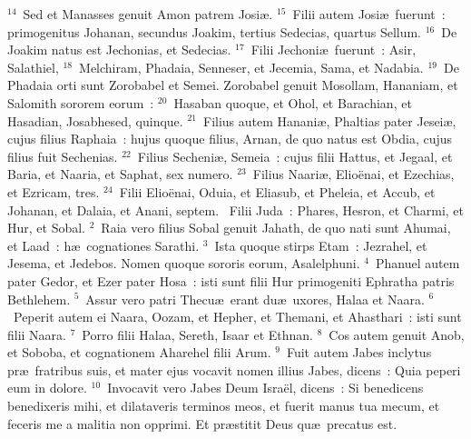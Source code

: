 ${}^{14}$~Sed et Manasses genuit Amon patrem Josi\ae .
${}^{15}$~Filii autem Josi\ae\ fuerunt~: primogenitus Johanan, secundus Joakim, tertius Sedecias, quartus Sellum.
${}^{16}$~De Joakim natus est Jechonias, et Sedecias.
${}^{17}$~Filii Jechoni\ae\ fuerunt~: Asir, Salathiel,
${}^{18}$~Melchiram, Phadaia, Senneser, et Jecemia, Sama, et Nadabia.
${}^{19}$~De Phadaia orti sunt Zorobabel et Semei. Zorobabel genuit Mosollam, Hananiam, et Salomith sororem eorum~:
${}^{20}$~Hasaban quoque, et Ohol, et Barachian, et Hasadian, Josabhesed, quinque.
${}^{21}$~Filius autem Hanani\ae , Phaltias pater Jesei\ae , cujus filius Raphaia~: hujus quoque filius, Arnan, de quo natus est Obdia, cujus filius fuit Sechenias.
${}^{22}$~Filius Secheni\ae , Semeia~: cujus filii Hattus, et Jegaal, et Baria, et Naaria, et Saphat, sex numero.
${}^{23}$~Filius Naari\ae , Elio\"enai, et Ezechias, et Ezricam, tres.
${}^{24}$~Filii Elio\"enai, Oduia, et Eliasub, et Pheleia, et Accub, et Johanan, et Dalaia, et Anani, septem.
~\lettrine[lines=10,image=true,loversize=0.05,lraise=-0.03]{F}{}ilii Juda~: Phares, Hesron, et Charmi, et Hur, et Sobal.
${}^{2}$~Raia vero filius Sobal genuit Jahath, de quo nati sunt Ahumai, et Laad~: h\ae\ cognationes Sarathi.
${}^{3}$~Ista quoque stirps Etam~: Jezrahel, et Jesema, et Jedebos. Nomen quoque sororis eorum, Asalelphuni.
${}^{4}$~Phanuel autem pater Gedor, et Ezer pater Hosa~: isti sunt filii Hur primogeniti Ephratha patris Bethlehem.
${}^{5}$~Assur vero patri Thecu\ae\ erant du\ae\ uxores, Halaa et Naara.
${}^{6}$~Peperit autem ei Naara, Oozam, et Hepher, et Themani, et Ahasthari~: isti sunt filii Naara.
${}^{7}$~Porro filii Halaa, Sereth, Isaar et Ethnan.
${}^{8}$~Cos autem genuit Anob, et Soboba, et cognationem Aharehel filii Arum.
${}^{9}$~Fuit autem Jabes inclytus pr\ae\ fratribus suis, et mater ejus vocavit nomen illius Jabes, dicens~: Quia peperi eum in dolore.
${}^{10}$~Invocavit vero Jabes Deum Isra\"el, dicens~: Si benedicens benedixeris mihi, et dilataveris terminos meos, et fuerit manus tua mecum, et feceris me a malitia non opprimi. Et pr\ae stitit Deus qu\ae\ precatus est.


